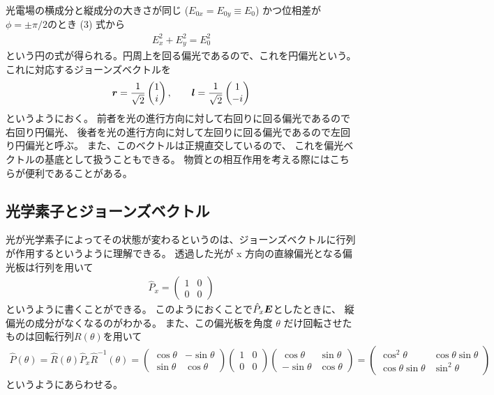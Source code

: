 \documentclass[9pt,dvipdfmx,a4paper]{jsarticle}
\begin{document}
光電場の横成分と縦成分の大きさが同じ (\(E_{0x}=E_{0y}\equiv E_0\)) かつ位相差が\(\phi=\pm\pi/2\)のとき
(3) 式から
\begin{align}
    E_x^2 + E_y^2 = E_0^2
\end{align}
という円の式が得られる。円周上を回る偏光であるので、これを円偏光という。
これに対応するジョーンズベクトルを
\begin{align}
    \vb*{r} = \frac{1}{\sqrt{2}}
    \begin{pmatrix}
        1\\i
    \end{pmatrix},\qquad
    \vb*{l} = \frac{1}{\sqrt{2}}
    \begin{pmatrix}
        1\\-i
    \end{pmatrix}
\end{align}
というようにおく。
前者を光の進行方向に対して右回りに回る偏光であるので右回り円偏光、
後者を光の進行方向に対して左回りに回る偏光であるので左回り円偏光と呼ぶ。
また、このベクトルは正規直交しているので、
これを偏光ベクトルの基底として扱うこともできる。
物質との相互作用を考える際にはこちらが便利であることがある。

\subsection{光学素子とジョーンズベクトル}
光が光学素子によってその状態が変わるというのは、ジョーンズベクトルに行列が作用するというように理解できる。
透過した光が x 方向の直線偏光となる偏光板は行列を用いて
\begin{align}
    \hat{P}_x =
    \begin{pmatrix}
        1 & 0\\
        0 & 0
    \end{pmatrix}
\end{align}
というように書くことができる。
このようにおくことで\(\hat{P}_x \vb*{E}\)としたときに、
縦偏光の成分がなくなるのがわかる。
また、この偏光板を角度 \(\theta\) だけ回転させたものは回転行列\(R(\theta)\)を用いて
\begin{align}
    \hat{P}(\theta) = \hat{R}(\theta)\hat{P}_x \hat{R}^{-1}(\theta)
    = \begin{pmatrix}
        \cos \theta & -\sin\theta\\
        \sin\theta & \cos\theta
    \end{pmatrix}
    \begin{pmatrix}
        1 & 0\\
        0 & 0
    \end{pmatrix}
    \begin{pmatrix}
        \cos \theta & \sin\theta\\
        -\sin\theta & \cos\theta
    \end{pmatrix}
    =\begin{pmatrix}
        \cos^2 \theta & \cos\theta\sin\theta\\
        \cos\theta\sin\theta & \sin^2\theta
    \end{pmatrix}
\end{align}
というようにあらわせる。
\end{document}
